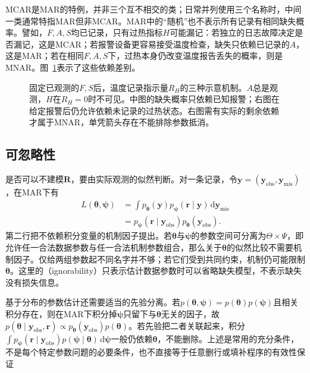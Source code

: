 MCAR是MAR的特例，并非三个互不相交的类；日常并列使用三个名称时，中间一类通常特指MAR但非MCAR。MAR中的“随机”也不表示所有记录有相同缺失概率。譬如，$F,A,S$均已记录，只有过热指标$H$可能漏记：若独立的日志故障决定是否漏记，这是MCAR；若报警设备更容易接受温度检查，缺失只依赖已记录的$A$，这是MAR；若在相同$F,A,S$下，过热本身仍改变温度报告丢失的概率，则是MNAR。图~\ref{fig:pgm-parameter-learning-missingness}表示了这些依赖差别。

\begin{figure}[htbp]
  \centering
  
  \caption{固定已观测的$F,S$后，温度记录指示量$R_H$的三种示意机制。$A$总是观测，$H$在$R_H=0$时不可见。中图的缺失概率只依赖已知报警；右图在给定报警后仍允许依赖未记录的过热状态。右图需有实际的剩余依赖才属于MNAR，单凭箭头存在不能排除参数抵消。}
  \label{fig:pgm-parameter-learning-missingness}
\end{figure}

\subsection{可忽略性}
\label{sec:pgm-parameter-learning-ignorability}

是否可以不建模$\bm{R}$，要由实际观测的似然判断。对一条记录，令$\bm{y}=(\bm{y}_{\mathrm{obs}},\bm{y}_{\mathrm{mis}})$，在MAR下有
\begin{equation}
  \begin{aligned}
    L(\bm{\theta},\bm{\psi})
      &=\int p_{\bm{\theta}}(\bm{y})
          p_{\bm{\psi}}(\bm{r}\mid\bm{y})
           \,\mathrm{d}\bm{y}_{\mathrm{mis}}\\
      &=p_{\bm{\psi}}(\bm{r}\mid\bm{y}_{\mathrm{obs}})
        p_{\bm{\theta}}(\bm{y}_{\mathrm{obs}}).
  \end{aligned}
  \label{eq:pgm-parameter-learning-ignorability-factorization}
\end{equation}
第二行把不依赖积分变量的机制因子提出。若$\bm{\theta}$与$\bm{\psi}$的参数空间可分离为$\Theta\times\Psi$，即允许任一合法数据参数与任一合法机制参数组合，那么关于$\bm{\theta}$的似然比较不需要机制因子。仅给两组参数起不同名字并不够；若它们受到共同约束，机制仍可能限制$\bm{\theta}$。这里的（ignorability）只表示估计数据参数时可以省略缺失模型，不表示缺失没有损失信息。

基于分布的参数估计还需要适当的先验分离。若$p(\bm{\theta},\bm{\psi})=p(\bm{\theta})p(\bm{\psi})$且相关积分存在，则在MAR下积分掉$\bm{\psi}$只留下与$\bm{\theta}$无关的因子，故$p(\bm{\theta}\mid\bm{y}_{\mathrm{obs}},\bm{r})\propto p_{\bm{\theta}}(\bm{y}_{\mathrm{obs}})p(\bm{\theta})$。若先验把二者关联起来，积分$\int p_{\bm{\psi}}(\bm{r}\mid\bm{y}_{\mathrm{obs}})p(\bm{\psi}\mid\bm{\theta})\,\mathrm{d}\bm{\psi}$一般仍依赖$\bm{\theta}$，不能删除。上述是常用的充分条件，不是每个特定参数问题的必要条件，也不直接等于任意删行或填补程序的有效性保证

